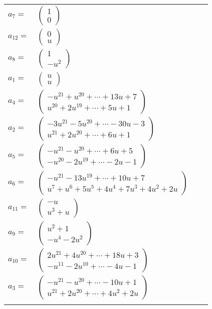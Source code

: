 \documentclass[1p]{elsarticle_modified}
\theoremstyle{definition}
\begin{document}
\begin{tabular}{m{7pt} m{180pt} m{7pt} m{180pt} }
\flushright $a_{7}=$&$\begin{pmatrix}1\\0\end{pmatrix}$ \\
\flushright $a_{12}=$&$\begin{pmatrix}0\\u\end{pmatrix}$ \\
\flushright $a_{8}=$&$\begin{pmatrix}1\\- u^2\end{pmatrix}$ \\
\flushright $a_{1}=$&$\begin{pmatrix}u\\u\end{pmatrix}$ \\
\flushright $a_{4}=$&$\begin{pmatrix}- u^{21}+u^{20}+\cdots+13 u+7\\u^{20}+2 u^{19}+\cdots+5 u+1\end{pmatrix}$ \\
\flushright $a_{2}=$&$\begin{pmatrix}-3 u^{21}-5 u^{20}+\cdots-30 u-3\\u^{21}+2 u^{20}+\cdots+6 u+1\end{pmatrix}$ \\
\flushright $a_{5}=$&$\begin{pmatrix}- u^{21}- u^{20}+\cdots+6 u+5\\- u^{20}-2 u^{19}+\cdots-2 u-1\end{pmatrix}$ \\
\flushright $a_{6}=$&$\begin{pmatrix}- u^{21}-13 u^{19}+\cdots+10 u+7\\u^7+u^6+5 u^5+4 u^4+7 u^3+4 u^2+2 u\end{pmatrix}$ \\
\flushright $a_{11}=$&$\begin{pmatrix}- u\\u^3+u\end{pmatrix}$ \\
\flushright $a_{9}=$&$\begin{pmatrix}u^2+1\\- u^4-2 u^2\end{pmatrix}$ \\
\flushright $a_{10}=$&$\begin{pmatrix}2 u^{21}+4 u^{20}+\cdots+18 u+3\\- u^{11}-2 u^{10}+\cdots-4 u-1\end{pmatrix}$ \\
\flushright $a_{3}=$&$\begin{pmatrix}- u^{21}- u^{20}+\cdots-10 u+1\\u^{21}+2 u^{20}+\cdots+4 u^2+2 u\end{pmatrix}$\\&\end{tabular}
\end{document}
